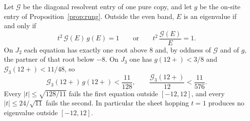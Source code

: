 \begin{proposition}
\label{prop:twobit}
Let \(\mathcal{G}\) be the diagonal resolvent entry of one pure copy, and
let \(g\) be the on-site entry of Proposition~\ref{prop:rung}.
Outside the even band, \(E\) is an eigenvalue if and only if
\begin{equation}
\label{eq:twobit}
t^2\,\mathcal{G}(E)\,g(E)=1
\qquad\text{or}\qquad
t^2\,\frac{\mathcal{G}(E)}{E}=1.
\end{equation}
On \(J_2\) each equation has exactly one root above \(8\) and, by oddness of
\(\mathcal{G}\) and of \(g\), the partner of that root below \(-8\).
On \(J_3\) one has \(g(12+)<3/8\) and \(\mathcal{G}_3(12+)<11/48\), so
\[
\mathcal{G}_3(12+)\,g(12+)<\frac{11}{128},
\qquad
\frac{\mathcal{G}_3(12+)}{12}<\frac{11}{576}.
\]
Every \(|t|\le\sqrt{128/11}\) fails the first equation outside \([-12,12]\),
and every \(|t|\le 24/\sqrt{11}\) fails the second.
In particular the sheet hopping \(t=1\) produces no eigenvalue outside
\([-12,12]\).
\end{proposition}

